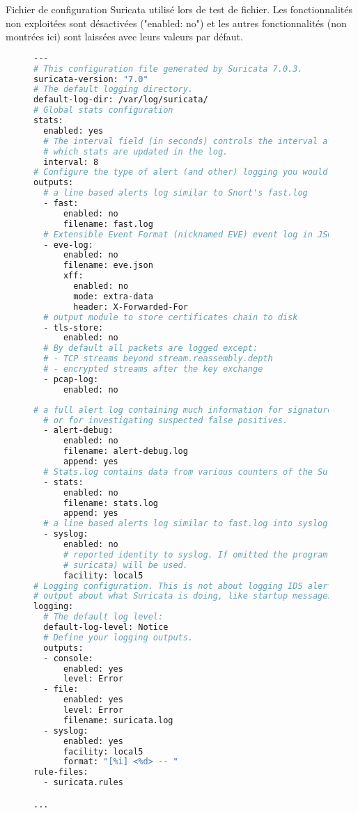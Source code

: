 
Fichier de configuration Suricata utilisé lors de test de fichier. Les fonctionnalités non exploitées sont désactivées ("enabled: no") et les autres fonctionnalités (non montrées ici) sont laissées avec leurs valeurs par défaut.

\vspace{1em}

\begin{figure}[h]%
    \center%
\begin{lstlisting}[language=Bash]
%YAML 1.1
---
# This configuration file generated by Suricata 7.0.3.
suricata-version: "7.0"
# The default logging directory.
default-log-dir: /var/log/suricata/
# Global stats configuration
stats:
  enabled: yes
  # The interval field (in seconds) controls the interval at
  # which stats are updated in the log.
  interval: 8
# Configure the type of alert (and other) logging you would like.
outputs:
  # a line based alerts log similar to Snort's fast.log
  - fast:
      enabled: no
      filename: fast.log
  # Extensible Event Format (nicknamed EVE) event log in JSON format
  - eve-log:
      enabled: no
      filename: eve.json
      xff:
        enabled: no
        mode: extra-data
        header: X-Forwarded-For
  # output module to store certificates chain to disk
  - tls-store:
      enabled: no
  # By default all packets are logged except:
  # - TCP streams beyond stream.reassembly.depth
  # - encrypted streams after the key exchange
  - pcap-log:
      enabled: no
\end{lstlisting}
\end{figure}

\newpage

\begin{figure}[h]%
    \center%
\begin{lstlisting}[language=Bash]
  # a full alert log containing much information for signature writers
  # or for investigating suspected false positives.
  - alert-debug:
      enabled: no
      filename: alert-debug.log
      append: yes
  # Stats.log contains data from various counters of the Suricata engine.
  - stats:
      enabled: no
      filename: stats.log
      append: yes
  # a line based alerts log similar to fast.log into syslog
  - syslog:
      enabled: no
      # reported identity to syslog. If omitted the program name (usually
      # suricata) will be used.
      facility: local5
# Logging configuration. This is not about logging IDS alerts/events, but
# output about what Suricata is doing, like startup messages, errors, etc.
logging:
  # The default log level:
  default-log-level: Notice
  # Define your logging outputs.
  outputs:
  - console:
      enabled: yes
      level: Error
  - file:
      enabled: yes
      level: Error
      filename: suricata.log
  - syslog:
      enabled: yes
      facility: local5
      format: "[%i] <%d> -- "
rule-files:
  - suricata.rules

...
\end{lstlisting}
\end{figure}